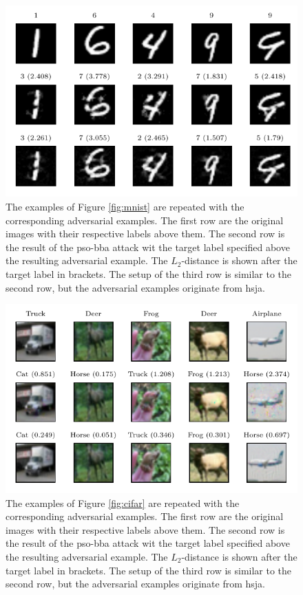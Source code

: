 \begin{figure}
\centering
\includegraphics[width=\textwidth]{Images/mnist_comparison.pdf}
\caption[Visual comparison of the adversarial MNIST examples of different attacks]{The examples of Figure \ref{fig:mnist} are repeated with the corresponding adversarial examples. The first row are the original images with their respective labels above them. The second row is the result of the \gls{pso}-\gls{bba} attack wit the target label specified above the resulting adversarial example. The $L_2$-distance is shown after the target label in brackets. The setup of the third row is similar to the second row, but the adversarial examples originate from \gls{hsja}. }
\label{fig:mnist_comparison}
\end{figure}

\begin{figure}
\centering
\includegraphics[width=\textwidth]{Images/cifar_comparison.pdf}
\caption[Visual comparison of the adversarial CIFAR examples of different attacks]{The examples of Figure \ref{fig:cifar} are repeated with the corresponding adversarial examples. The first row are the original images with their respective labels above them. The second row is the result of the \gls{pso}-\gls{bba} attack wit the target label specified above the resulting adversarial example. The $L_2$-distance is shown after the target label in brackets. The setup of the third row is similar to the second row, but the adversarial examples originate from \gls{hsja}. }
\label{fig:cifar_comparison}
\end{figure}